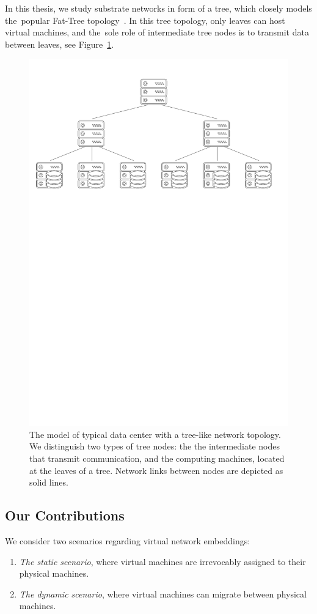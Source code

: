 In this thesis, we study substrate networks in form of a tree, which closely models the~popular Fat-Tree topology~\cite{fat-trees}.
In this tree topology, only leaves can host virtual machines, and the~sole role of intermediate tree nodes is to transmit data between leaves, see Figure~\ref{fig:tree-topology}.


\begin{figure}[t]
\centering
\includegraphics[width=0.79\columnwidth]{figs/tree-topology.pdf}
\caption{The model of typical data center with a tree-like network topology. We distinguish two types of tree nodes: the the intermediate nodes that transmit communication, and the computing machines, located at the leaves of a tree. Network links between nodes are depicted as solid lines.}\label{fig:tree-topology}
\vspace{-1em}
\end{figure}


\subsection{Our Contributions}

We consider two scenarios regarding virtual network embeddings:
\begin{enumerate}
  \item \emph{The static scenario}, where virtual machines are irrevocably assigned to their physical machines.
  \item \emph{The dynamic scenario}, where virtual machines can migrate between physical machines.
\end{enumerate}

